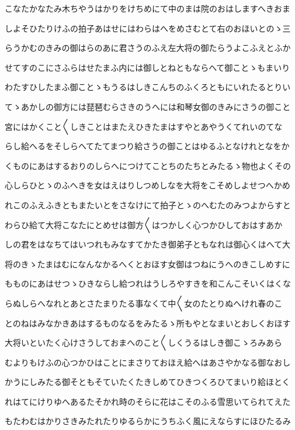 \documentclass[a4paper,11pt,landscape]{ltjtarticle}
\begin{document}
こなたかなたみ木ちやうはかりをけちめにて中のまは院のおはしますへきおま
\par\medskip
しよそひたりけふの拍子あはせにはわらはへをめさむとて右のおほいとのゝ三
\par\medskip
らうかむのきみの御はらのあに君さうのふえ左大将の御たらうよこふえとふか
\par\medskip
せてすのこにさふらはせたまふ内には御しとねともならへて御ことゝもまいり
\par\medskip
わたすひしたまふ御ことゝもうるはしきこんちのふくろともにいれたるとりい
\par\medskip
てゝあかしの御方には琵琶むらさきのうへには和琴女御のきみにさうの御こと
\par\medskip
宮にはかくこと〱しきことはまたえひきたまはすやとあやうくてれいのてな
\par\medskip
らし給へるをそしらへてたてまつり給さうの御ことはゆるふとなけれとなをか
\par\medskip
くものにあはするおりのしらへにつけてことちのたちとみたるゝ物也よくその
\par\medskip
心しらひとゝのふへきを女はえはりしつめしなを大将をこそめしよせつへかめ
\par\medskip
れこのふえふきともまたいとをさなけにて拍子とゝのへむたのみつよからすと
\par\medskip
わらひ給て大将こなたにとめせは御方〱はつかしく心つかひしておはすあか
\par\medskip
しの君をはなちてはいつれもみなすてかたき御弟子ともなれは御心くはへて大
\par\medskip
将のきゝたまはむになんなかるへくとおほす女御はつねにうへのきこしめすに
\par\medskip
もものにあはせつゝひきならし給つれはうしろやすきを和こんこそいくはくな
\par\medskip
らぬしらへなれとあとさたまりたる事なくて中〱女のたとりぬへけれ春のこ
\par\medskip
とのねはみなかきあはするものなるをみたるゝ所もやとなまいとおしくおほす
\par\medskip
大将いといたく心けさうしておまへのこと〱しくうるはしき御こゝろみあら
\par\medskip
むよりもけふの心つかひはことにまさりておほえ給へはあさやかなる御なおし
\par\medskip
かうにしみたる御そともそていたくたきしめてひきつくろひてまいり給ほとく
\par\medskip
れはてにけりゆへあるたそかれ時のそらに花はこそのふる雪思いてられてえた
\par\medskip
もたわむはかりさきみたれたりゆるらかにうちふく風にえならすにほひたるみ
\end{document}
